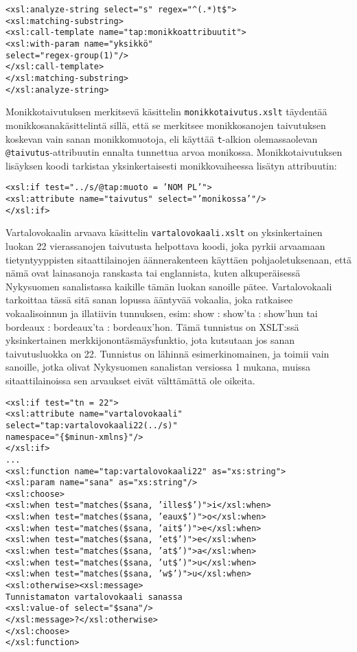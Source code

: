 \documentclass[free]{flammie}
\begin{document}
\begin{verbatim}
<xsl:analyze-string select="s" regex="^(.*)t$">
<xsl:matching-substring>
<xsl:call-template name="tap:monikkoattribuutit">
<xsl:with-param name="yksikkö"
select="regex-group(1)"/>
</xsl:call-template>
</xsl:matching-substring>
</xsl:analyze-string>
\end{verbatim}

Monikkotaivutuksen merkitsevä käsittelin \texttt{monikkotaivutus.xslt} täydentää
monikkosanakäsittelintä sillä, että se merkitsee monikkosanojen taivutuksen
koskevan vain sanan monikkomuotoja, eli käyttää \texttt{t}-alkion olemassaolevan
\texttt{@taivutus}-attribuutin ennalta tunnettua arvoa monikossa. Monikkotaivutuksen
lisäyksen koodi tarkistaa yksinkertaisesti monikkovaiheessa lisätyn attribuutin:

\begin{verbatim}
<xsl:if test="../s/@tap:muoto = ’NOM PL’">
<xsl:attribute name="taivutus" select="’monikossa’"/>
</xsl:if>
\end{verbatim}

Vartalovokaalin arvaava käsittelin \texttt{vartalovokaali.xslt} on yksinkertainen
luokan 22 vierassanojen taivutusta helpottava koodi, joka pyrkii arvaamaan tietyntyyppisten sitaattilainojen äännerakenteen käyttäen pohjaoletuksenaan, että nämä ovat lainasanoja ranskasta tai englannista, kuten alkuperäisessä Nykysuomen
sanalistassa kaikille tämän luokan sanoille pätee. Vartalovokaali tarkoittaa tässä sitä sanan lopussa ääntyvää vokaalia, joka ratkaisee vokaalisoinnun ja illatiivin tunnuksen, esim: show : show’ta : show’hun tai bordeaux : bordeaux’ta :
bordeaux’hon. Tämä tunnistus on XSLT:ssä yksinkertainen merkkijonontäsmäysfunktio, jota kutsutaan jos sanan taivutusluokka on 22. Tunnistus on lähinnä esimerkinomainen, ja toimii vain sanoille, jotka olivat Nykysuomen sanalistan versiossa 1 mukana, muissa sitaattilainoissa sen arvaukset eivät välttämättä ole oikeita.

\begin{verbatim}
<xsl:if test="tn = 22">
<xsl:attribute name="vartalovokaali"
select="tap:vartalovokaali22(../s)"
namespace="{$minun-xmlns}"/>
</xsl:if>
...
<xsl:function name="tap:vartalovokaali22" as="xs:string">
<xsl:param name="sana" as="xs:string"/>
<xsl:choose>
<xsl:when test="matches($sana, ’illes$’)">i</xsl:when>
<xsl:when test="matches($sana, ’eaux$’)">o</xsl:when>
<xsl:when test="matches($sana, ’ait$’)">e</xsl:when>
<xsl:when test="matches($sana, ’et$’)">e</xsl:when>
<xsl:when test="matches($sana, ’at$’)">a</xsl:when>
<xsl:when test="matches($sana, ’ut$’)">u</xsl:when>
<xsl:when test="matches($sana, ’w$’)">u</xsl:when>
<xsl:otherwise><xsl:message>
Tunnistamaton vartalovokaali sanassa
<xsl:value-of select="$sana"/>
</xsl:message>?</xsl:otherwise>
</xsl:choose>
</xsl:function>
\end{verbatim}
\end{document}
